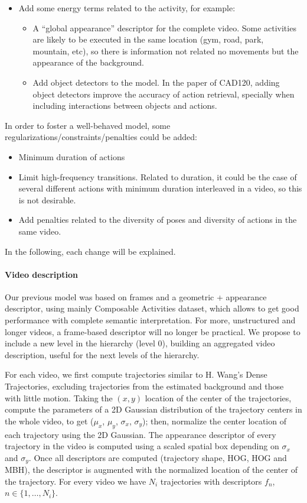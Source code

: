 \documentclass[10pt,letterpaper]{article}
\newcommand{\+}[1]{\ensuremath{{\boldsymbol #1}}}
\begin{document}
\begin{itemize}
\item Add some energy terms related to the activity, for example:
\begin{itemize}
\item A ``global appearance'' descriptor for the complete video. Some activities are likely to be executed in the same location (gym, road, park, mountain, etc), so there is information not related no movements but the appearance of the background.
\item Add object detectors to the model. In the paper of CAD120, adding object detectors improve the accuracy of action retrieval, specially when including interactions between objects and actions. 
\end{itemize} 
\end{itemize}

In order to foster a well-behaved model, some regularizations/constraints/penalties could be added:
\begin{itemize}
\item Minimum duration of actions
\item Limit high-frequency transitions. Related to duration, it could be the case of several different actions with minimum duration interleaved in a video, so this is not desirable. 
\item Add penalties related to the diversity of poses and diversity of actions in the same video.
\end{itemize}
In the following, each change will be explained.

\paragraph{Video description}

Our previous model was based on frames and a geometric + appearance descriptor, using mainly Composable Activities dataset, which allows to get good performance with complete semantic interpretation. For more, unstructured and longer videos, a frame-based descriptor will no longer  be practical.  We propose to include a new level in the hierarchy (level 0), building an aggregated video description, useful for the next levels of the hierarchy.
 
For each video, we first compute trajectories similar to H. Wang's Dense Trajectories, excluding trajectories from the estimated background and those with little motion. Taking the $(x,y)$ location of the center of the trajectories,  compute the parameters of a 2D Gaussian distribution of the trajectory centers in the whole video, to get ($\mu_x$, $\mu_y$, $\sigma_x$, $\sigma_y$); then, normalize the center location of each trajectory using the 2D Gaussian. The appearance descriptor of every trajectory in the video is computed using a scaled spatial box depending on $\sigma_x$ and $\sigma_y$. Once all descriptors are computed (trajectory shape, HOG, HOG and MBH), the descriptor is augmented with the normalized location of the center of the trajectory. For every video we have $N_i$ trajectories with descriptors $f_n$, $n \in \{1,\dots,N_i\}$.  
\end{document}
